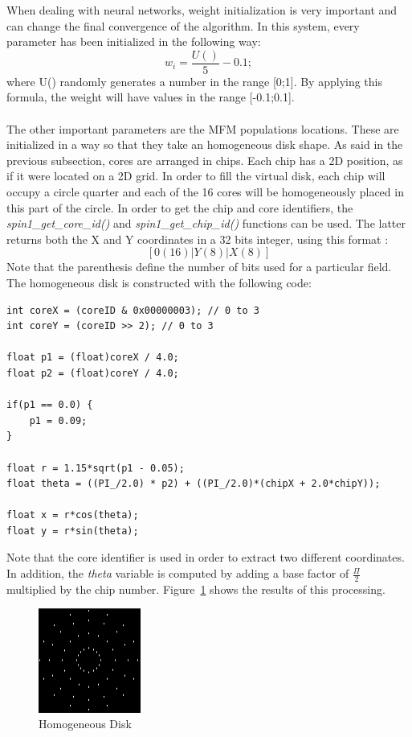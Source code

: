 \documentclass{article}
\begin{document}
When dealing with neural networks, weight initialization is very important and can change the final convergence of the algorithm. In this system, every parameter has been initialized in the following way:
\[
w_{i} = 	\frac{U()}{5} - 0.1; 
\]
where U() randomly generates a number in the range [0;1]. By applying this formula, the weight will have values in the range [-0.1;0.1].\\ \\

The other important parameters are the MFM populations locations. These are initialized in a way so that they take an homogeneous disk shape. As said in the previous 
subsection, cores are arranged in chips. Each chip has a 2D position, as if it were located on a 2D grid. In order to fill the virtual disk, each chip will occupy a circle quarter and each of the 16 cores will be homogeneously placed in this part of the circle. In order to get the chip and core identifiers, the \textit{spin1\_get\_core\_id()} and \textit{spin1\_get\_chip\_id()} functions can be used. The latter returns both the X and Y coordinates in a 32 bits integer, using this format :
\[
[ 0 (16) | Y (8) | X (8) ]
\]
Note that the parenthesis define the number of bits used for a particular field. \\
The homogeneous disk is constructed with the following code:
\begin{verbatim}
int coreX = (coreID & 0x00000003); // 0 to 3
int coreY = (coreID >> 2); // 0 to 3

float p1 = (float)coreX / 4.0;
float p2 = (float)coreY / 4.0;

if(p1 == 0.0) {
	p1 = 0.09;
}

float r = 1.15*sqrt(p1 - 0.05);
float theta = ((PI_/2.0) * p2) + ((PI_/2.0)*(chipX + 2.0*chipY));

float x = r*cos(theta);
float y = r*sin(theta);
\end{verbatim}
Note that the core identifier is used in order to extract two different coordinates. In addition, the \textit{theta} variable is computed by adding a base factor of \( \frac{\Pi }{2}\) multiplied by the chip number. Figure~\ref{fig:disk} shows the results of this processing.

\begin{figure}[h]
\begin{center}
\includegraphics[width=0.3\textwidth]{mfm}
\caption{Homogeneous Disk}
\label{fig:disk}
\end{center}
\end{figure}
\end{document}
